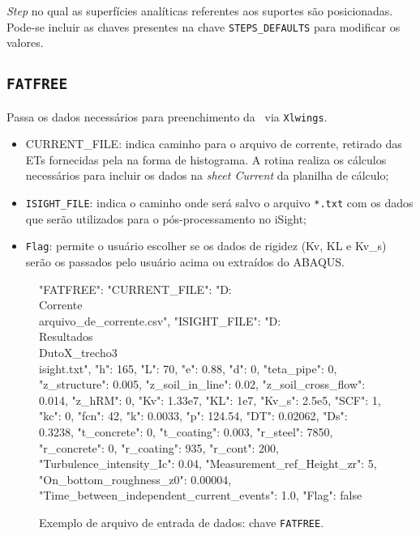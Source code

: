 \textit{Step} no qual as superfícies analíticas referentes aos suportes são posicionadas. Pode-se incluir as chaves presentes na chave \texttt{STEPS\_DEFAULTS} para modificar os valores.


\subsection{\texttt{FATFREE}}

Passa os dados necessários para preenchimento da \fatfree~via \texttt{Xlwings}.

\begin{itemize}
  \item {CURRENT\_FILE}: indica caminho para o arquivo de corrente, retirado das ETs fornecidas pela na forma de histograma. A rotina realiza os cálculos necessários para incluir os dados na \textit{sheet Current} da planilha de cálculo;
  \item \texttt{ISIGHT\_FILE}: indica o caminho onde será salvo o arquivo \texttt{*.txt} com os dados que serão utilizados para o pós-processamento no iSight;
  \item \texttt{Flag}: permite o usuário escolher se os dados de rigidez (Kv, KL e  Kv\_s) serão os passados pelo usuário acima ou extraídos do ABAQUS.
\end{itemize}

\begin{figure}
\caption{Exemplo de arquivo de entrada de dados: chave \texttt{FATFREE}.}\label{lst:fatfree}
\begin{jsoncode}
{
  "FATFREE": {
    "CURRENT_FILE": "D:\\Corrente\\arquivo_de_corrente.csv",
    "ISIGHT_FILE": "D:\\Resultados\\DutoX_trecho3\\isight.txt",
    "h": 165,
    "L": 70,
    "e": 0.88,
    "d": 0,
    "teta_pipe": 0,
    "z_structure": 0.005,
    "z_soil_in_line": 0.02,
    "z_soil_cross_flow": 0.014,
    "z_hRM": 0,
    "Kv": 1.33e7,
    "KL": 1e7,
    "Kv_s": 2.5e5,
    "SCF": 1,
    "kc": 0,
    "fcn": 42,
    "k": 0.0033,
    "p": 124.54,
    "DT": 0.02062,
    "Ds": 0.3238,
    "t_concrete": 0,
    "t_coating": 0.003,
    "r_steel": 7850,
    "r_concrete": 0,
    "r_coating": 935,
    "r_cont": 200,
    "Turbulence_intensity_Ic": 0.04,
    "Measurement_ref_Height_zr": 5,
    "On_bottom_roughness_z0": 0.00004,
    "Time_between_independent_current_events": 1.0,
    "Flag": false
  }
}
\end{jsoncode}
\end{figure}


